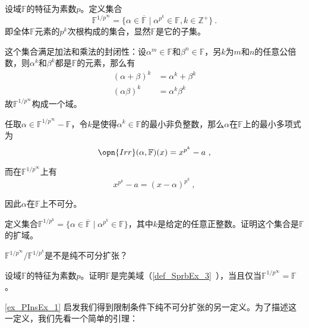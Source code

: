 \begin{example}{}\label{ex_PInsEx_1}
设域$\mathbb{F}$的特征为素数$p$。定义集合
\begin{equation}
\mathbb{F}^{1/p^\infty} = \{\alpha\in\overline{\mathbb{F}}\mid \alpha^{p^k}\in\mathbb{F}, k\in\mathbb{Z}^+\}~.
\end{equation}
即全体$\mathbb{F}$元素的$p^k$次根构成的集合，显然$\mathbb{F}$是它的子集。

这个集合满足加法和乘法的封闭性：设$\alpha^m\in\mathbb{F}$和$\beta^n\in\mathbb{F}$，另$k$为$m$和$n$的任意公倍数，则$\alpha^k$和$\beta^k$都是$\mathbb{F}$的元素，那么有
\begin{equation}
\begin{aligned}
(\alpha+\beta)^k&=\alpha^k+\beta^k\\
(\alpha\beta)^k&=\alpha^k\beta^k
\end{aligned}
\end{equation}
故$\mathbb{F}^{1/p^\infty}$构成一个域。

任取$\alpha\in\mathbb{F}^{1/p^\infty}-\mathbb{F}$，令$k$是使得$\alpha^k\in\mathbb{F}$的最小非负整数，那么$\alpha$在$\mathbb{F}$上的最小多项式为
\begin{equation}
\opn{Irr}(\alpha, \mathbb{F})(x) = x^{p^k}-a~,
\end{equation}

而在$\mathbb{F}^{1/p^\infty}$上有
\begin{equation}
x^{p^k}-a = (x-\alpha)^{p^k}~,
\end{equation}

因此$\alpha$在$\mathbb{F}$上不可分。

\end{example}



\begin{exercise}{}
定义集合$\mathbb{F}^{1/p^k}=\{\alpha\in\overline{\mathbb{F}}\mid \alpha^{p^k}\in\mathbb{F}\}$，其中$k$是给定的任意正整数。证明这个集合是$\mathbb{F}$的扩域。

$\mathbb{F}^{1/p^\infty}/\mathbb{F}^{1/p^k}$是不是纯不可分扩张？
\end{exercise}


\begin{exercise}{}
设域$\mathbb{F}$的特征为素数$p$。证明$\mathbb{F}$是完美域（\autoref{def_SprbEx_3}~），当且仅当$\mathbb{F}^{1/p^\infty}=\mathbb{F}$。
\end{exercise}



\autoref{ex_PInsEx_1} 启发我们得到限制条件下纯不可分扩张的另一定义。为了描述这一定义，我们先看一个简单的引理：

